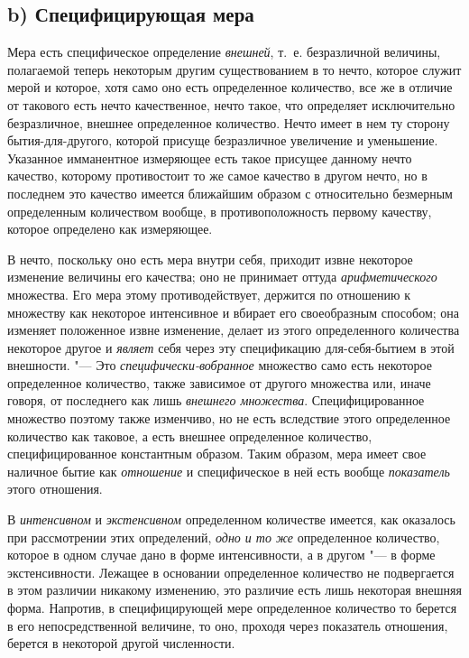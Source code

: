 \subsection[b) Специфицирующая мера]{b) Специфицирующая мера}
Мера есть специфическое определение
{\em внешней}, т.~е. безразличной величины, полагаемой
теперь некоторым другим существованием в то нечто, которое служит мерой и
которое, хотя само оно есть определенное количество, все же в отличие от
такового есть нечто качественное, нечто такое, что определяет исключительно
безразличное, внешнее определенное количество. Нечто имеет в нем ту сторону
бытия-для-другого, которой присуще безразличное увеличение и уменьшение.
Указанное имманентное измеряющее есть такое присущее данному нечто
качество, которому противостоит то же самое качество в другом нечто, но в
последнем это качество имеется ближайшим образом с относительно безмерным
определенным количеством вообще, в противоположность первому качеству,
которое определено как измеряющее.

В нечто, поскольку оно есть мера внутри себя, приходит извне некоторое
изменение величины его качества; оно не принимает оттуда
{\em арифметического} множества. Его мера этому
противодействует, держится по отношению к множеству как некоторое
интенсивное и вбирает его своеобразным способом; она изменяет положенное
извне изменение, делает из этого определенного количества некоторое другое
и {\em являет} себя через эту спецификацию
для-себя-бытием в этой внешности. "--- Это
{\em специфически-вобранное} множество само есть
некоторое определенное количество, также зависимое от другого множества
или, иначе говоря, от последнего как лишь {\em внешнего
множества}. Специфицированное множество поэтому также изменчиво, но не есть
вследствие этого определенное количество как таковое, а есть внешнее
определенное количество, специфицированное константным образом. Таким
образом, мера имеет свое наличное бытие как
{\em отношение} и специфическое в ней есть вообще
{\em показатель} этого отношения.

В {\em интенсивном} и
{\em экстенсивном} определенном количестве имеется, как
оказалось при рассмотрении этих определений, {\em одно
и то же} определенное количество, которое в одном случае дано в форме
интенсивности, а в другом "--- в форме экстенсивности. Лежащее в основании
определенное количество не подвергается в этом различии никакому изменению,
это различие есть лишь некоторая внешняя форма. Напротив, в специфицирующей
мере определенное количество то берется в его непосредственной величине, то
оно, проходя через показатель отношения, берется в некоторой другой
численности.

